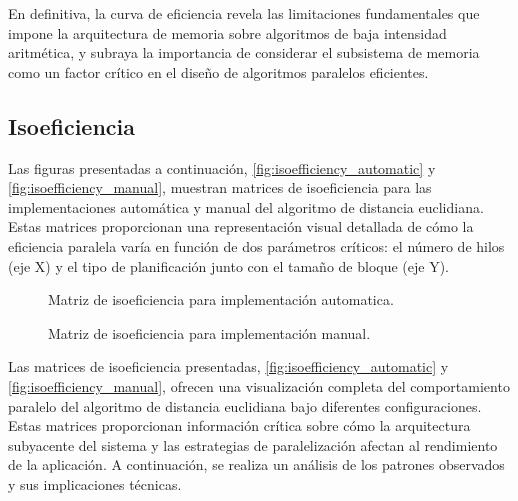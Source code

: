         En definitiva, la curva de eficiencia revela las limitaciones fundamentales que impone la arquitectura de memoria sobre algoritmos de baja intensidad aritmética, y subraya la importancia de considerar el subsistema de memoria como un factor crítico en el diseño de algoritmos paralelos eficientes.
        
    \subsection{Isoeficiencia}

        Las figuras presentadas a continuación, \autoref{fig:isoefficiency_automatic} y \autoref{fig:isoefficiency_manual}, muestran matrices de isoeficiencia para las implementaciones automática y manual del algoritmo de distancia euclidiana. Estas matrices proporcionan una representación visual detallada de cómo la eficiencia paralela varía en función de dos parámetros críticos: el número de hilos (eje X) y el tipo de planificación junto con el tamaño de bloque (eje Y).

        \begin{figure}[H]
            \centering
            \caption{Matriz de isoeficiencia para implementación automatica.}
            \label{fig:isoefficiency_automatic}
        \end{figure}

        \begin{figure}[H]
            \centering
            \caption{Matriz de isoeficiencia para implementación manual.}
            \label{fig:isoefficiency_manual}
        \end{figure}

        Las matrices de isoeficiencia presentadas, \autoref{fig:isoefficiency_automatic} y \autoref{fig:isoefficiency_manual}, ofrecen una visualización completa del comportamiento paralelo del algoritmo de distancia euclidiana bajo diferentes configuraciones. Estas matrices proporcionan información crítica sobre cómo la arquitectura subyacente del sistema y las estrategias de paralelización afectan al rendimiento de la aplicación. A continuación, se realiza un análisis de los patrones observados y sus implicaciones técnicas.

